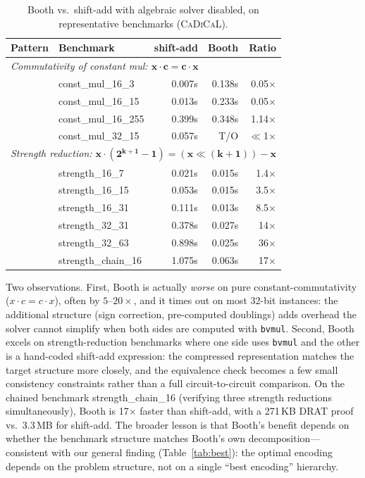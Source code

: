 \documentclass[a4paper]{ceurart}
\newcommand{\cadical}{\textsc{CaDiCaL}\xspace}
\begin{document}
\begin{table}[ht]
\caption{Booth vs.\ shift-add with algebraic solver disabled,
  on representative benchmarks (\cadical).}
\label{tab:booth-sweep}
\centering
\small
\begin{tabular}{llrrr}
\toprule
Pattern & Benchmark & shift-add & Booth & Ratio \\
\midrule
\multicolumn{5}{l}{\emph{Commutativity of constant mul: $\mathbf{x\cdot c = c \cdot x}$}} \\
& const\_mul\_16\_3 & 0.007s & 0.138s & 0.05$\times$ \\
& const\_mul\_16\_15 & 0.013s & 0.233s & 0.05$\times$ \\
& const\_mul\_16\_255 & 0.399s & 0.348s & 1.14$\times$ \\
& const\_mul\_32\_15 & 0.057s & T/O & $\ll$1$\times$ \\
\midrule
\multicolumn{5}{l}{\emph{Strength reduction: $\mathbf{x \cdot (2^{k+1}-1) = (x \ll (k{+}1)) - x}$}} \\
& strength\_16\_7 & 0.021s & 0.015s & 1.4$\times$ \\
& strength\_16\_15 & 0.053s & 0.015s & 3.5$\times$ \\
& strength\_16\_31 & 0.111s & 0.013s & 8.5$\times$ \\
& strength\_32\_31 & 0.378s & 0.027s & 14$\times$ \\
& strength\_32\_63 & 0.898s & 0.025s & 36$\times$ \\
& strength\_chain\_16 & 1.075s & 0.063s & 17$\times$ \\
\bottomrule
\end{tabular}
\end{table}

Two observations. First, Booth is actually \emph{worse} on pure
constant-commutativity ($x \cdot c = c \cdot x$), often by
$5$--$20\times$, and it times out on most 32-bit instances: the
additional structure (sign correction, pre-computed doublings) adds
overhead the solver cannot simplify when both sides are computed
with \texttt{bvmul}. Second, Booth excels on strength-reduction
benchmarks where one side uses \texttt{bvmul} and the other is a
hand-coded shift-add expression: the compressed representation
matches the target structure more closely, and the equivalence
check becomes a few small consistency constraints rather than a
full circuit-to-circuit comparison. On the chained benchmark
strength\_chain\_16 (verifying three strength reductions
simultaneously), Booth is 17$\times$ faster than shift-add, with a
271\,KB DRAT proof vs.\ 3.3\,MB for shift-add. The broader lesson
is that Booth's benefit depends on whether the benchmark structure
matches Booth's own decomposition---consistent with our general
finding (Table~\ref{tab:best}): the optimal encoding depends on
the problem structure, not on a single ``best encoding''
hierarchy.
\end{document}
